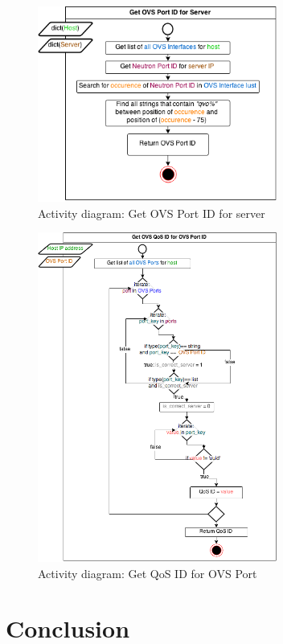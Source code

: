 \begin{figure}[H]
\centering

\includegraphics[width=0.7\textwidth]{images/design/activity_get_ovs_port_server}

\caption{Activity diagram: Get OVS Port ID for server}
\end{figure}

\begin{figure}[H]
\centering

\includegraphics[width=0.7\textwidth]{images/design/activity_get_qos_id_for_ovs_port}

\caption{Activity diagram: Get QoS ID for OVS Port}
\end{figure}



\section{Conclusion}